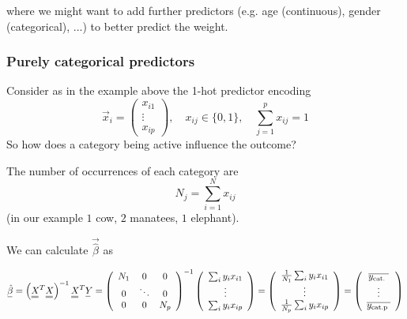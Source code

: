 where we might want to add further predictors (e.g. age (continuous), gender (categorical), ...) to 
better predict the weight.

\subsubsection{Purely categorical predictors}
Consider as in the example above the 1-hot predictor encoding
\begin{equation}
    \vec{x}_i = \begin{pmatrix}
        x_{i1} \\
        \vdots \\
        x_{ip}
    \end{pmatrix}, \quad x_{ij} \in \{0,1\}, \quad \sum_{j=1}^p x_{ij} = 1
\end{equation}
So how does a category being active influence the outcome?

The number of occurrences of each category are
\begin{equation}
    N_j = \sum_{i=1}^N x_{ij}
\end{equation}
(in our example $1$ cow, $2$ manatees, $1$ elephant).

We can calculate $\vec{\hat{\beta}}$ as

\begin{equation}
    \vec{\hat{\beta}}=\left(\mat{X}^T \mat{X}\right)^{-1} \mat{X}^T \vec{Y}=\left(\begin{array}{ccc}
    N_1 & 0 & 0 \\
    0 & \ddots & 0 \\
    0 & 0 & N_p
    \end{array}\right)^{-1}\left(\begin{array}{c}
    \sum_i y_i x_{i 1} \\
    \vdots \\
    \sum_i y_i x_{i p}
    \end{array}\right)=\left(\begin{array}{c}
    \frac{1}{N_1} \sum_i y_i x_{i 1} \\
    \vdots \\
    \frac{1}{N_p} \sum_i y_i x_{i p}
    \end{array}\right)=\left(\begin{array}{c}
    \overline{y_{\text {cat. }}} \\
    \vdots \\
    \overline{y_{\text {cat.p }}}
    \end{array}\right)
\end{equation}

